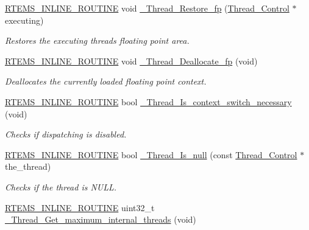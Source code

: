 \begin{DoxyCompactItemize}
\mbox{\hyperlink{group__RTEMSScoreBaseDefs_gac216239df231d5dbd15e3520b0b9313f}{R\+T\+E\+M\+S\+\_\+\+I\+N\+L\+I\+N\+E\+\_\+\+R\+O\+U\+T\+I\+NE}} void \mbox{\hyperlink{group__RTEMSScoreThread_ga575076c753d2ea7ee875eea80b638127}{\+\_\+\+Thread\+\_\+\+Restore\+\_\+fp}} (\mbox{\hyperlink{struct__Thread__Control}{Thread\+\_\+\+Control}} $\ast$executing)
\begin{DoxyCompactList}\small\item\em Restores the executing thread\textquotesingle{}s floating point area. \end{DoxyCompactList}\item 
\mbox{\hyperlink{group__RTEMSScoreBaseDefs_gac216239df231d5dbd15e3520b0b9313f}{R\+T\+E\+M\+S\+\_\+\+I\+N\+L\+I\+N\+E\+\_\+\+R\+O\+U\+T\+I\+NE}} void \mbox{\hyperlink{group__RTEMSScoreThread_ga5dd30edce9fc1961d1f5a35123c41029}{\+\_\+\+Thread\+\_\+\+Deallocate\+\_\+fp}} (void)
\begin{DoxyCompactList}\small\item\em Deallocates the currently loaded floating point context. \end{DoxyCompactList}\item 
\mbox{\hyperlink{group__RTEMSScoreBaseDefs_gac216239df231d5dbd15e3520b0b9313f}{R\+T\+E\+M\+S\+\_\+\+I\+N\+L\+I\+N\+E\+\_\+\+R\+O\+U\+T\+I\+NE}} bool \mbox{\hyperlink{group__RTEMSScoreThread_ga960061380ad461173f7f190e9d75385d}{\+\_\+\+Thread\+\_\+\+Is\+\_\+context\+\_\+switch\+\_\+necessary}} (void)
\begin{DoxyCompactList}\small\item\em Checks if dispatching is disabled. \end{DoxyCompactList}\item 
\mbox{\hyperlink{group__RTEMSScoreBaseDefs_gac216239df231d5dbd15e3520b0b9313f}{R\+T\+E\+M\+S\+\_\+\+I\+N\+L\+I\+N\+E\+\_\+\+R\+O\+U\+T\+I\+NE}} bool \mbox{\hyperlink{group__RTEMSScoreThread_gac83d0184fec31c3968e595ee8a28033b}{\+\_\+\+Thread\+\_\+\+Is\+\_\+null}} (const \mbox{\hyperlink{struct__Thread__Control}{Thread\+\_\+\+Control}} $\ast$the\+\_\+thread)
\begin{DoxyCompactList}\small\item\em Checks if the thread is N\+U\+LL. \end{DoxyCompactList}\item 
\mbox{\hyperlink{group__RTEMSScoreBaseDefs_gac216239df231d5dbd15e3520b0b9313f}{R\+T\+E\+M\+S\+\_\+\+I\+N\+L\+I\+N\+E\+\_\+\+R\+O\+U\+T\+I\+NE}} uint32\+\_\+t \mbox{\hyperlink{group__RTEMSScoreThread_ga7bbab15663bd69884801378fdeaed47b}{\+\_\+\+Thread\+\_\+\+Get\+\_\+maximum\+\_\+internal\+\_\+threads}} (void)

\end{DoxyCompactItemize}
